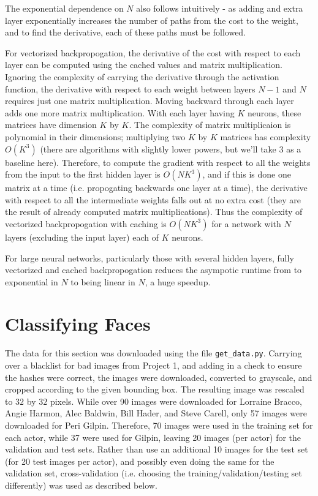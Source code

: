 \documentclass{article}
\begin{document}
   The exponential dependence on $N$ also follows intuitively - as adding and extra layer
   exponentially increases the number of paths from the cost to the weight, and to find
   the derivative, each of these paths must be followed.

   For vectorized backpropogation, the derivative of the cost with respect to each layer
   can be computed using the cached values and matrix multiplication. Ignoring the complexity
   of carrying the derivative through the activation function, the derivative with respect to
   each weight between layers $N-1$ and $N$ requires just one matrix multiplication.
   Moving backward through each layer adds one more matrix multiplication.
   With each layer having $K$ neurons, these matrices have dimension $K$ by $K$.
   The complexity of matrix multiplicaion is polynomial in their dimensions; multiplying two
   $K$ by $K$ matrices has complexity $O(K^3)$ (there are algorithms with slightly lower powers,
   but we'll take $3$ as a baseline here). Therefore, to compute the gradient with respect to all
   the weights from the input to the first hidden layer is $O(N K^3)$, and if this is done
   one matrix at a time (i.e. propogating backwards one layer at a time), the derivative
   with respect to all the intermediate weights falls out at no extra cost (they are the
   result of already computed matrix multiplications).
   Thus the complexity of vectorized backpropogation with caching is $O(N K^3)$ for a
   network with $N$ layers (excluding the input layer) each of $K$ neurons.

   For large neural networks, particularly those with several hidden layers, fully vectorized
   and cached backpropogation reduces the asympotic runtime from to exponential in $N$ to being
   linear in $N$, a huge speedup.


   \section{Classifying Faces}
   The data for this section was downloaded using the file \texttt{get\_data.py}. Carrying over
   a blacklist for bad images from Project 1, and adding in a check to ensure the hashes were
   correct, the images were downloaded, converted to grayscale, and cropped according to the given
   bounding box. The resulting image was rescaled to $32$ by $32$ pixels.
   While over 90 images were downloaded for Lorraine Bracco, Angie Harmon, Alec Baldwin,
   Bill Hader, and Steve Carell, only 57 images were downloaded for Peri Gilpin.
   Therefore, 70 images were used in the training set for each actor, while 37 were used for Gilpin,
   leaving 20 images (per actor) for the validation and test sets. Rather than use an
   additional 10 images for the test set (for 20 test images per actor), and possibly even doing
   the same for the validation set, cross-validation (i.e. choosing the training/validation/testing
   set differently) was used as described below.
\end{document}
